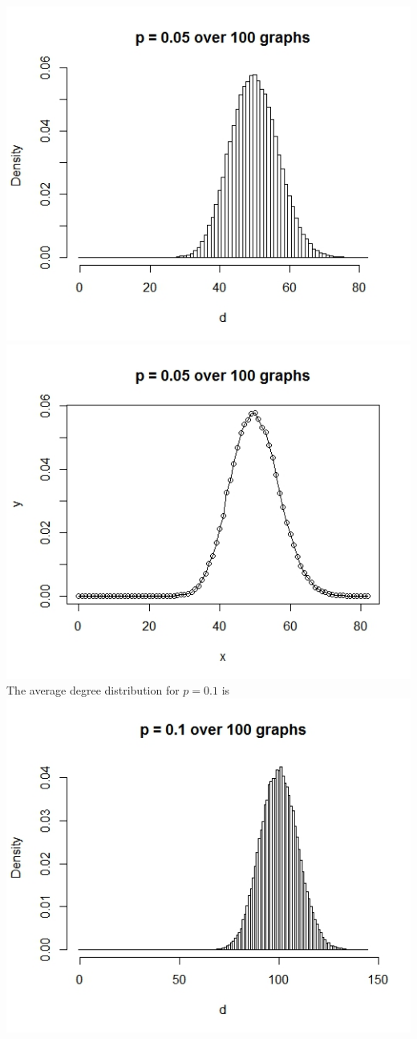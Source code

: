 \documentclass{article}
\begin{document}
\includegraphics[scale=0.4]{pa7} \\
\includegraphics[scale=0.4]{pa8} \\
The average degree distribution for $p=0.1$ is \\
\includegraphics[scale=0.4]{pa11} \\
\end{document}
